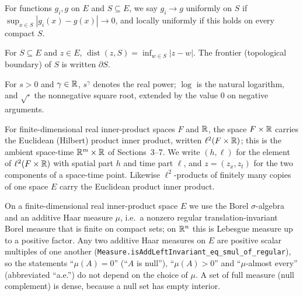 \begin{definition}
For functions $g_i,g$ on $E$ and $S\subseteq E$, we say $g_i\to g$ uniformly on
$S$ if $\sup_{x\in S}|g_i(x)-g(x)|\to0$, and locally uniformly if this holds on
every compact $S$.
\end{definition}

\begin{definition}
For $S\subseteq E$ and $z\in E$, $\operatorname{dist}(z,S)=\inf_{w\in S}|z-w|$.
The frontier (topological boundary) of $S$ is written $\partial S$.
\end{definition}

\begin{definition}
For $s>0$ and $\gamma\in\mathbb{R}$, $s^\gamma$ denotes the real power; $\log$ is the
natural logarithm, and $\sqrt{\cdot}$ the nonnegative square root, extended by
the value $0$ on negative arguments.
\end{definition}

\begin{definition}
For finite-dimensional real inner-product spaces $F$ and $\mathbb{R}$, the space
$F\times\mathbb{R}$ carries the Euclidean (Hilbert) product inner product, written
$\ell^2(F\times\mathbb{R})$; this is the ambient space-time $\mathbb{R}^m\times\mathbb{R}$ of
Sections~3--7. We write $(h,\ell)$ for the element of $\ell^2(F\times\mathbb{R})$ with
spatial part $h$ and time part $\ell$, and $z=(z_x,z_t)$ for the two components
of a space-time point. Likewise $\ell^2$-products of finitely many copies of one
space $E$ carry the Euclidean product inner product.
\end{definition}

\begin{definition}
On a finite-dimensional real inner-product space $E$ we use the Borel
$\sigma$-algebra and an additive Haar measure $\mu$, i.e.\ a nonzero regular
translation-invariant Borel measure that is finite on compact sets; on
$\mathbb{R}^n$ this is Lebesgue measure up to a positive factor. Any two additive Haar
measures on $E$ are positive scalar multiples of one another
(\texttt{Measure.isAddLeftInvariant\_eq\_smul\_of\_regular}), so the statements
``$\mu(A)=0$'' (``$A$ is null''), ``$\mu(A)>0$'' and ``$\mu$-almost every''
(abbreviated ``a.e.'') do not depend on the choice of $\mu$. A set of full
measure (null complement) is dense, because a null set has empty interior.
\end{definition}

